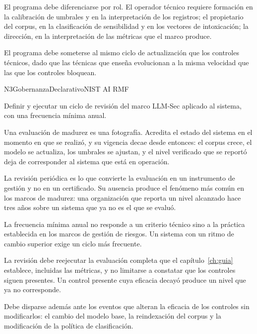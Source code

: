 El programa debe diferenciarse por rol. El operador técnico requiere formación en la calibración de umbrales y en la interpretación de los registros; el propietario del corpus, en la clasificación de sensibilidad y en los vectores de intoxicación; la dirección, en la interpretación de las métricas que el marco produce.

El programa debe someterse al mismo ciclo de actualización que los controles técnicos, dado que las técnicas que enseña evolucionan a la misma velocidad que las que los controles bloquean.


  {N3}{Gobernanza}{Declarativo}{NIST AI RMF}

Definir y ejecutar un ciclo de revisión del marco LLM-Sec aplicado al sistema, con una frecuencia mínima anual.

Una evaluación de madurez es una fotografía. Acredita el estado del sistema en el momento en que se realizó, y su vigencia decae desde entonces: el corpus crece, el modelo se actualiza, los umbrales se ajustan, y el nivel verificado que se reportó deja de corresponder al sistema que está en operación.

La revisión periódica es lo que convierte la evaluación en un instrumento de gestión y no en un certificado. Su ausencia produce el fenómeno más común en los marcos de madurez: una organización que reporta un nivel alcanzado hace tres años sobre un sistema que ya no es el que se evaluó.

La frecuencia mínima anual no responde a un criterio técnico sino a la práctica establecida en los marcos de gestión de riesgos. Un sistema con un ritmo de cambio superior exige un ciclo más frecuente.

La revisión debe reejecutar la evaluación completa que el capítulo~\ref{ch:guia} establece, incluidas las métricas, y no limitarse a constatar que los controles siguen presentes. Un control presente cuya eficacia decayó produce un nivel que ya no corresponde.

Debe disparse además ante los eventos que alteran la eficacia de los controles sin modificarlos: el cambio del modelo base, la reindexación del corpus y la modificación de la política de clasificación.

